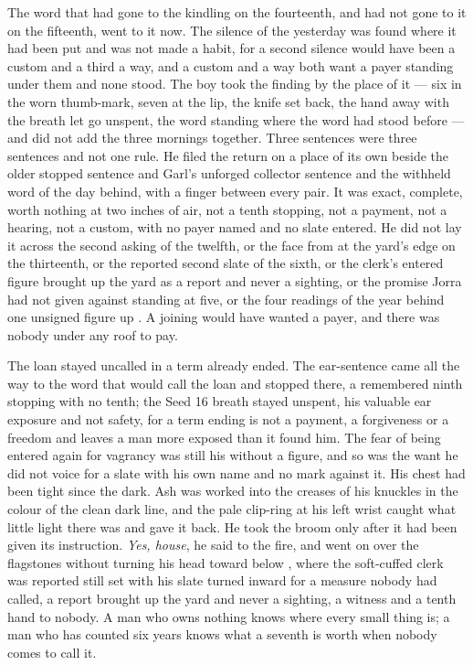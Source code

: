 The word that had gone to the kindling on the fourteenth, and had not gone to it on the fifteenth, went to it now. The silence of the yesterday was found where it had been put and was not made a habit, for a second silence would have been a custom and a third a way, and a custom and a way both want a payer standing under them and none stood. The boy took the finding by the place of it --- six in the worn thumb-mark, seven at the lip, the knife set back, the hand away with the breath let go unspent, the word standing where the word had stood before --- and did not add the three mornings together. Three sentences were three sentences and not one rule. He filed the return on a place of its own beside the older stopped sentence and Garl's unforged collector sentence and the withheld word of the day behind, with a finger between every pair. It was exact, complete, worth nothing at two inches of air, not a tenth stopping, not a payment, not a hearing, not a custom, with no payer named and no slate entered. He did not lay it across the second asking of the twelfth, or the face from  at the yard's edge on the thirteenth, or the reported second slate of the sixth, or the clerk's entered figure brought up the yard as a report and never a sighting, or the promise Jorra had not given against  standing at five, or the four readings of the year behind one unsigned figure up . A joining would have wanted a payer, and there was nobody under any roof to pay.

The loan stayed uncalled in a term already ended. The ear-sentence came all the way to the word that would call the loan and stopped there, a remembered ninth stopping with no tenth; the Seed 16 breath stayed unspent, his valuable ear exposure and not safety, for a term ending is not a payment, a forgiveness or a freedom and leaves a man more exposed than it found him. The fear of being entered again for vagrancy was still his without a figure, and so was the want he did not voice for a slate with his own name and no mark against it. His chest had been tight since the dark. Ash was worked into the creases of his knuckles in the colour of the clean dark line, and the pale clip-ring at his left wrist caught what little light there was and gave it back. He took the broom only after it had been given its instruction. \emph{Yes, house}, he said to the fire, and went on over the flagstones without turning his head toward  below , where the soft-cuffed clerk was reported still set with his slate turned inward for a measure nobody had called, a report brought up the yard and never a sighting, a witness and a tenth hand to nobody. A man who owns nothing knows where every small thing is; a man who has counted six years knows what a seventh is worth when nobody comes to call it.

